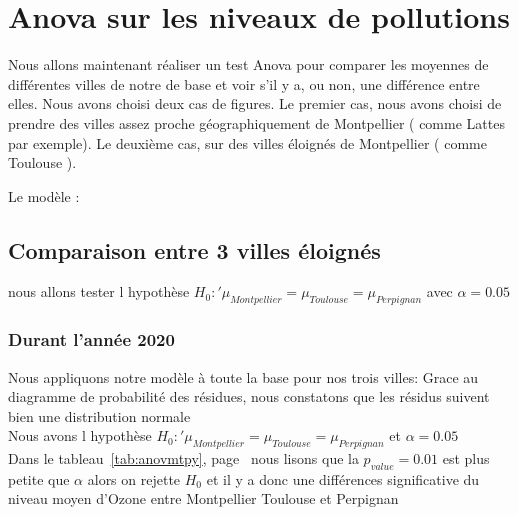 \documentclass[a4paper,11pt,twoside,openright]{report}
\theoremstyle{plain}
\theoremstyle{definition}
\theoremstyle{remark}
\begin{document}

\chapter{Anova sur les niveaux de pollutions}
\label{cha:Anova}

Nous allons maintenant réaliser un test Anova pour comparer les moyennes de différentes villes de notre de base et voir s'il y a, ou non, une différence entre elles. Nous avons choisi deux cas de figures. Le premier cas, nous avons choisi de prendre des villes assez proche géographiquement de Montpellier ( comme Lattes par exemple). Le deuxième cas, sur des villes éloignés de Montpellier ( comme Toulouse ).

Le modèle :  


\section{Comparaison entre 3 villes éloignés}
\label{sec:Comparaison entre  3 villes éloignés}

nous allons tester l hypothèse  $H_0 :'\mu_{Montpellier}=\mu_{Toulouse}=\mu_{Perpignan}$ avec $\alpha=0.05$\\


\subsection{Durant l'année 2020}
\label{sec:Durant l'année 2020}

Nous appliquons notre modèle à toute la base pour nos trois villes: 
Grace au diagramme de probabilité des résidues, nous constatons que les résidus suivent bien une distribution normale \\

Nous avons l hypothèse  $H_0 :'\mu_{Montpellier}=\mu_{Toulouse}=\mu_{Perpignan}$ et $\alpha=0.05$\\

Dans le tableau~\ref{tab:anovmtpy}, page~\pageref{tab:anovmtpy} nous lisons que la $p_{value} = 0.01$ est plus petite que $\alpha$ alors on rejette $H_0$  et il y a donc une différences significative du niveau moyen d'Ozone entre Montpellier Toulouse et Perpignan
\end{document}
